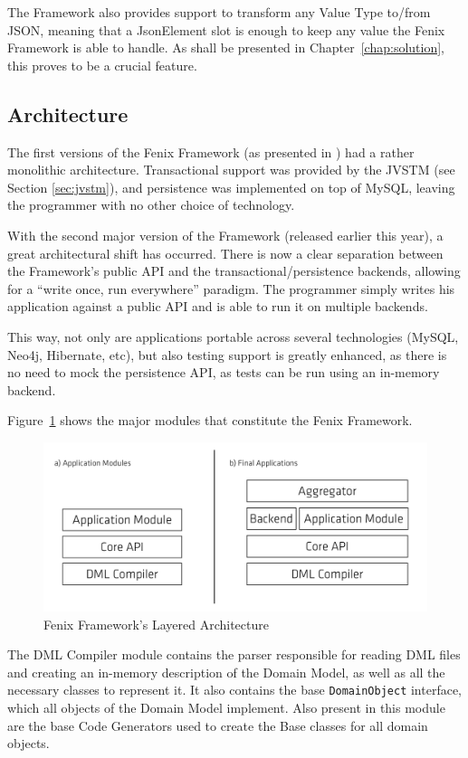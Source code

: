 \documentclass{llncs}
\begin{document}
The Framework also provides support to transform any Value Type
to/from JSON, meaning that a JsonElement slot is enough to keep any
value the Fenix Framework is able to handle. As shall be presented in
Chapter~\ref{chap:solution}, this proves to be a crucial feature.

\subsection{Architecture}
\label{sec:ff-arch}

The first versions of the Fenix Framework (as presented in
\cite{fernandes2011strict}) had a rather monolithic
architecture. Transactional support was provided by the JVSTM (see
Section \ref{sec:jvstm}), and persistence was implemented on top of
MySQL, leaving the programmer with no other choice of technology.

With the second major version of the Framework (released earlier this
year), a great architectural shift has occurred. There is now a clear
separation between the Framework's public API and the
transactional/persistence backends, allowing for a ``write once, run
everywhere'' paradigm. The programmer simply writes his application
against a public API and is able to run it on multiple backends.

This way, not only are applications portable across several
technologies (MySQL, Neo4j, Hibernate, etc), but also testing support is
greatly enhanced, as there is no need to mock the persistence API, as
tests can be run using an in-memory backend.

Figure~\ref{fig:ff-arch} shows the major modules that constitute the Fenix
Framework.

\begin{figure}
\centering
\includegraphics[width=0.8\linewidth]{ff-arch}
\caption{Fenix Framework's Layered Architecture}
\label{fig:ff-arch}
\end{figure}

The DML Compiler module contains the parser responsible for reading
DML files and creating an in-memory description of the Domain Model,
as well as all the necessary classes to represent it. It also contains
the base \texttt{DomainObject} interface, which all objects of the Domain
Model implement. Also present in this module are the base Code
Generators used to create the Base classes for all domain
objects.
\end{document}
